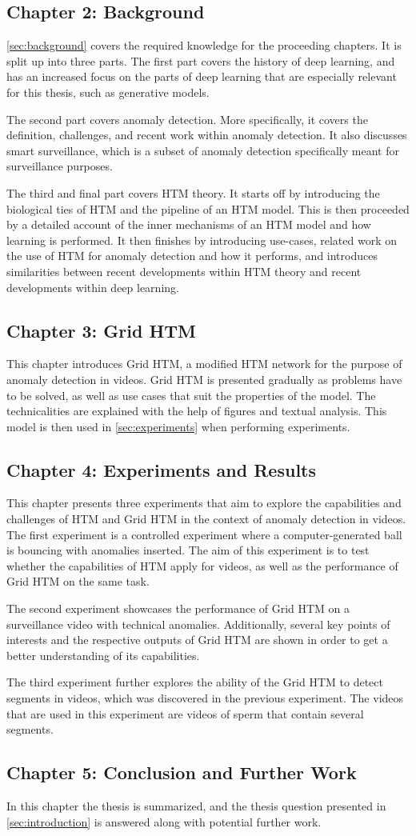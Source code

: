\subsection*{Chapter 2: Background}
\autoref{sec:background} covers the required knowledge for the proceeding chapters. It is split up into three parts. The first part covers the history of deep learning, and has an increased focus on the parts of deep learning that are especially relevant for this thesis, such as generative models.
\par
The second part covers anomaly detection. More specifically, it covers the definition, challenges, and recent work within anomaly detection. It also discusses smart surveillance, which is a subset of anomaly detection specifically meant for surveillance purposes.
\par
The third and final part covers HTM theory. It starts off by introducing the biological ties of HTM and the pipeline of an HTM model. This is then proceeded by a detailed account of the inner mechanisms of an HTM model and how learning is performed. It then finishes by introducing use-cases, related work on the use of HTM for anomaly detection and how it performs, and introduces similarities between recent developments within HTM theory and recent developments within deep learning.
\subsection*{Chapter 3: Grid HTM}
This chapter introduces Grid HTM, a modified HTM network for the purpose of anomaly detection in videos. Grid HTM is presented gradually as problems have to be solved, as well as use cases that suit the properties of the model. The technicalities are explained with the help of figures and textual analysis. This model is then used in \autoref{sec:experiments} when performing experiments.
\subsection*{Chapter 4: Experiments and Results}
This chapter presents three experiments that aim to explore the capabilities and challenges of HTM and Grid HTM in the context of anomaly detection in videos. The first experiment is a controlled experiment where a computer-generated ball is bouncing with anomalies inserted. The aim of this experiment is to test whether the capabilities of HTM apply for videos, as well as the performance of Grid HTM on the same task.
\par
The second experiment showcases the performance of Grid HTM on a surveillance video with technical anomalies. Additionally, several key points of interests and the respective outputs of Grid HTM are shown in order to get a better understanding of its capabilities.
\par
The third experiment further explores the ability of the Grid HTM to detect segments in videos, which was discovered in the previous experiment. The videos that are used in this experiment are videos of sperm that contain several segments.
\subsection*{Chapter 5: Conclusion and Further Work}
In this chapter the thesis is summarized, and the thesis question presented in \autoref{sec:introduction} is answered along with potential further work.